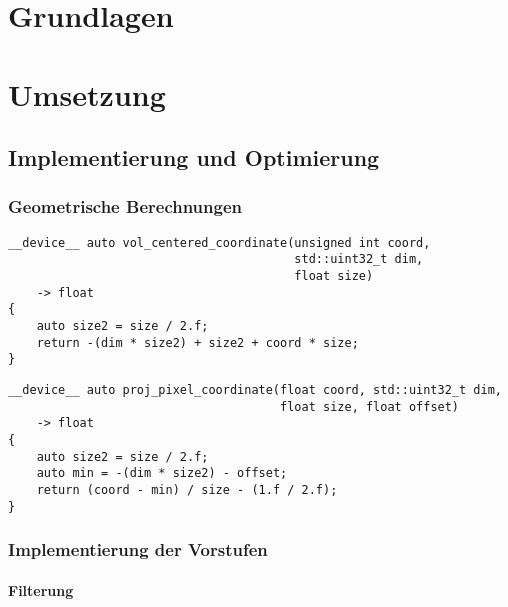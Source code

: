 \appendix

\chapter{Grundlagen}

\chapter{Umsetzung}

\section{Implementierung und Optimierung}

\subsection{Geometrische Berechnungen}

\begin{code}
\begin{verbatim}
__device__ auto vol_centered_coordinate(unsigned int coord,
                                        std::uint32_t dim,
                                        float size)
    -> float
{
    auto size2 = size / 2.f;
    return -(dim * size2) + size2 + coord * size;
}
\end{verbatim}
\label{app:coord_vol}
\end{code}

\begin{code}
\begin{verbatim}
__device__ auto proj_pixel_coordinate(float coord, std::uint32_t dim,
                                      float size, float offset)
    -> float
{
    auto size2 = size / 2.f;
    auto min = -(dim * size2) - offset;
    return (coord - min) / size - (1.f / 2.f);
}
\end{verbatim}
\label{app:coord_det}
\end{code}

\subsection{Implementierung der Vorstufen}

\subsubsection{Filterung}

